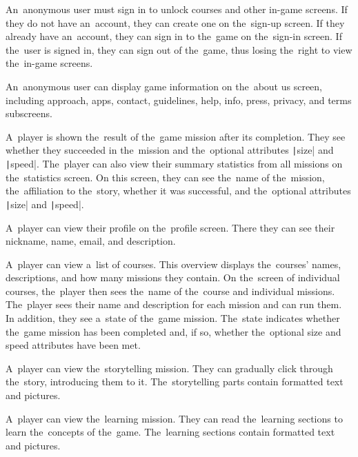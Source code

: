 \pagebreak
\begin{enumerate}[label=\textbf{F\arabic*}, ref=\labelenumi]
     An~anonymous user must sign in to unlock courses and other in-game screens.
    If they do not have an~account, they can create one on the~sign-up screen.
    If they already have an~account, they can sign in to the~game on the~sign-in screen.
    If the~user is signed in, they can sign out of the~game, thus losing the~right to view the~in-game screens.

     An~anonymous user can display game information on the~about us screen, including approach, apps, contact, guidelines, help, info, press, privacy, and terms subscreens.

     A~player is shown the~result of the~game mission after its completion.
    They see whether they succeeded in the~mission and the~optional attributes \texttt|size| and \texttt|speed|.
    The~player can also view their summary statistics from all missions on the~statistics screen.
    On this screen, they can see the~name of the~mission, the~affiliation to the~story, whether it was successful, and the~optional attributes \texttt|size| and \texttt|speed|.

     A~player can view their profile on the~profile screen.
    There they can see their nickname, name, email, and description.

     A~player can view a~list of courses.
    This overview displays the~courses' names, descriptions, and how many missions they contain.
    On the~screen of individual courses, the~player then sees the~name of the~course and individual missions.
    The~player sees their name and description for each mission and can run them.
    In addition, they see a~state of the~game mission.
    The~state indicates whether the~game mission has been completed and, if so, whether the~optional size and speed attributes have been met.

     A~player can view the~storytelling mission.
    They can gradually click through the~story, introducing them to it.
    The~storytelling parts contain formatted text and pictures.

     A~player can view the~learning mission.
    They can read the~learning sections to learn the~concepts of the~game.
    The~learning sections contain formatted text and pictures. 
    

\end{enumerate}

